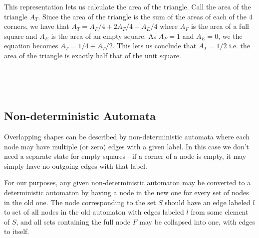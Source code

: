 \documentclass{article}
\begin{document}
This representation lets us calculate the area of the triangle. Call the area of the triangle $A_T$. Since the area of the triangle is the sum of the areas of each of the 4 corners, we have that $A_T = A_F/4 + 2A_T/4 + A_E/4$ where $A_F$ is the area of a full square and $A_E$ is the area of an empty square. As $A_F=1$ and $A_E=0$, we the equation becomes $A_T = 1/4 + A_T/2$. This lets us conclude that $A_T = 1/2$ i.e. the area of the triangle is exactly half that of the unit square.

\ 

\ 

 
 \newpage
\subsection{Non-deterministic Automata}
Overlapping shapes can be described by non-deterministic automata where each node may have multiple (or zero) edges with a given label. In this case we don't need a separate state for empty squares - if a corner of a node is empty, it may simply have no outgoing edges with that label.

For our purposes, any given non-deterministic automaton may be converted to a deterministic automaton by having a node in the new one for every set of nodes in the old one. The node corresponding to the set $S$ should have an edge labeled $l$ to set of all nodes in the old automaton with edges labeled $l$ from some element of $S$, and all sets containing the full node $F$ may be collapsed into one, with edges to itself.
\end{document}
